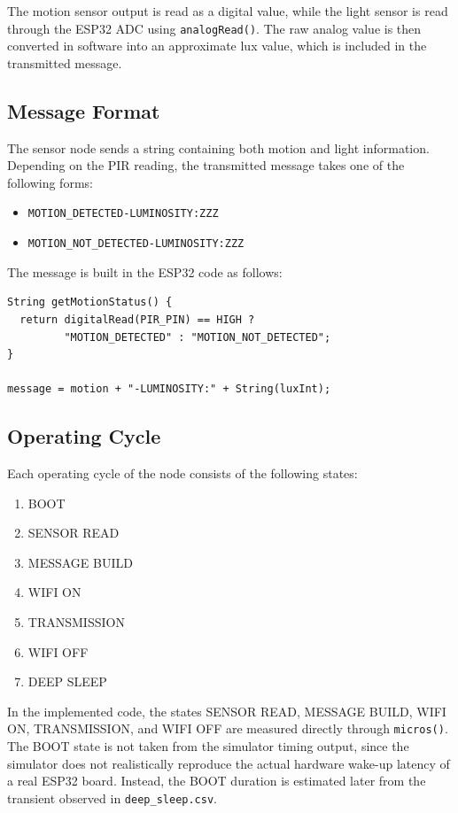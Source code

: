 \documentclass{article}
\begin{document}
The motion sensor output is read as a digital value, while the light sensor is read through the ESP32 ADC using \texttt{analogRead()}. 
The raw analog value is then converted in software into an approximate lux value, which is included in the transmitted message.


\subsection{Message Format}

The sensor node sends a string containing both motion and light information. 
Depending on the PIR reading, the transmitted message takes one of the following forms:

\begin{itemize}
    \item \texttt{MOTION\_DETECTED-LUMINOSITY:ZZZ}
    \item \texttt{MOTION\_NOT\_DETECTED-LUMINOSITY:ZZZ}
\end{itemize}

The message is built in the ESP32 code as follows:

\begin{verbatim}
String getMotionStatus() {
  return digitalRead(PIR_PIN) == HIGH ?
         "MOTION_DETECTED" : "MOTION_NOT_DETECTED";
}

message = motion + "-LUMINOSITY:" + String(luxInt);
\end{verbatim}


\subsection{Operating Cycle}

Each operating cycle of the node consists of the following states:
\begin{enumerate}
    \item BOOT
    \item SENSOR READ
    \item MESSAGE BUILD
    \item WIFI ON
    \item TRANSMISSION
    \item WIFI OFF
    \item DEEP SLEEP
\end{enumerate}

In the implemented code, the states SENSOR READ, MESSAGE BUILD, WIFI ON, TRANSMISSION, and WIFI OFF are measured directly through \texttt{micros()}. The BOOT state is not taken from the simulator timing output, since the simulator does not realistically reproduce the actual hardware wake-up latency of a real ESP32 board. Instead, the BOOT duration is estimated later from the transient observed in \texttt{deep\_sleep.csv}.
\end{document}

